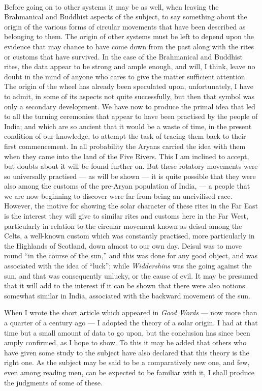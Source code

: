 \documentclass[a4paper, 11pt, oneside, polutonikogreek, english]{article}
\begin{document}
\paragraph{}
Before going on to other systems it may be as well, when leaving the Brahmanical and Buddhist aspects of the subject, to say something about the origin of the various forms of circular movements that have been described as belonging to them. The origin of other systems must be left to depend upon the evidence that may chance to have come down from the past along with the rites or customs that have survived. In the case of the Brahmanical and Buddhist rites, the data appear to be strong and ample enough, and will, I think, leave no doubt in the mind of anyone who cares to give the matter sufficient attention. The origin of the wheel has already been speculated upon, unfortunately, I have to admit, in some of its aspects not quite successfully, but then that symbol was only a secondary development. We have now to produce the primal idea that led to all the turning ceremonies that appear to have been practised by the people of India; and which are so ancient that it would be a waste of time, in the present condition of our knowledge, to attempt the task of tracing them back to their first commencement. In all probability the Aryans carried the idea with them when they came into the land of the Five Rivers. This I am inclined to accept, but doubts about it will be found further on. But these rotatory movements were so universally practised --- as will be shown --- it is quite possible that they were also among the customs of the pre-Aryan population of India, --- a people that we are now beginning to discover were far from being an uncivilised race. However, the motive for showing the solar character of these rites in the Far East is the interest they will give to similar rites and customs here in the Far West, particularly in relation to the circular movement known as deisul among the Celts, a well-known custom which was constantly practised, more particularly in the Highlands of Scotland, down almost to our own day. Deisul was to move round ``in the course of the sun,'' and this was done for any good object, and was associated with the idea of ``luck''; while \emph{Widdershins} was the going against the sun, and that was consequently unlucky, or the cause of evil. It may be presumed that it will add to the interest if it can be shown that there were also notions somewhat similar in India, associated with the backward movement of the sun.

When I wrote the short article which appeared in \emph{Good Words} --- now more than a quarter of a century ago --- I adopted the theory of a solar origin. I had at that time but a small amount of data to go upon, but the conclusion has since been amply confirmed, as I hope to show. To this it may be added that others who have given some study to the subject have also declared that this theory is the right one. As the subject may be said to be a comparatively new one, and few, even among reading men, can be expected to be familiar with it, I shall produce the judgments of some of these.
\end{document}

